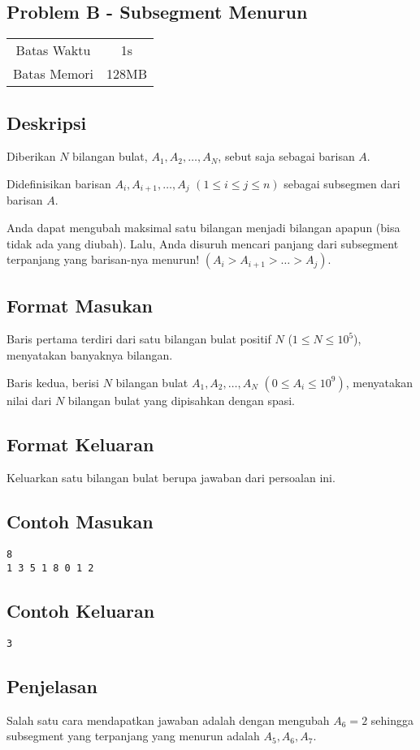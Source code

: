 \documentclass{article}
\begin{document}
\begin{center}
    \section*{Problem B - Subsegment Menurun} %
    \begin{tabular}{ | c c | }
        \hline
        Batas Waktu  & 1s \\    %
        Batas Memori & 128MB \\  %
        \hline
    \end{tabular}
\end{center}

\subsection*{Deskripsi}

Diberikan $N$ bilangan bulat, $A_1, A_2, \dots, A_N$, sebut saja sebagai barisan $A$.

Didefinisikan barisan $A_i, A_{i+1}, \dots  , A_j$ $(1 \leq i \leq j \leq n)$ sebagai subsegmen dari barisan $A$.

Anda dapat mengubah maksimal satu bilangan menjadi bilangan apapun (bisa tidak ada yang diubah). Lalu, Anda disuruh mencari panjang dari subsegment terpanjang yang barisan-nya menurun! $(A_i > A_{i + 1} > \dots > A_j)$.

\subsection*{Format Masukan}

Baris pertama terdiri dari satu bilangan bulat positif $N$ ($1 \leq N \leq 10^5$), menyatakan banyaknya bilangan.

Baris kedua, berisi $N$ bilangan bulat $A_1, A_2, \dots, A_N$ $(0 \leq A_i \leq 10^9)$, menyatakan nilai dari $N$ bilangan bulat yang dipisahkan dengan spasi.

\subsection*{Format Keluaran}

Keluarkan satu bilangan bulat berupa jawaban dari persoalan ini.

\begin{multicols}{2}
\subsection*{Contoh Masukan}
\begin{lstlisting}
8
1 3 5 1 8 0 1 2
\end{lstlisting}
\columnbreak
\subsection*{Contoh Keluaran}
\begin{lstlisting}
3
\end{lstlisting}
\vfill
\null
\end{multicols}

\subsection*{Penjelasan}

Salah satu cara mendapatkan jawaban adalah dengan mengubah $A_6 = 2$ sehingga subsegment yang terpanjang yang menurun adalah $A_5, A_6, A_7$.

\pagebreak
\end{document}
